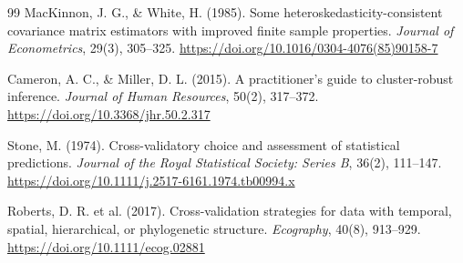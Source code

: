 \documentclass{style}
\begin{document}
\begin{thebibliography}{99}
MacKinnon, J. G., \& White, H. (1985). Some heteroskedasticity-consistent covariance matrix estimators with improved finite sample properties. \textit{Journal of Econometrics}, 29(3), 305--325. \url{https://doi.org/10.1016/0304-4076(85)90158-7}

Cameron, A. C., \& Miller, D. L. (2015). A practitioner's guide to cluster-robust inference. \textit{Journal of Human Resources}, 50(2), 317--372. \url{https://doi.org/10.3368/jhr.50.2.317}

Stone, M. (1974). Cross-validatory choice and assessment of statistical predictions. \textit{Journal of the Royal Statistical Society: Series B}, 36(2), 111--147. \url{https://doi.org/10.1111/j.2517-6161.1974.tb00994.x}

Roberts, D. R. et al. (2017). Cross-validation strategies for data with temporal, spatial, hierarchical, or phylogenetic structure. \textit{Ecography}, 40(8), 913--929. \url{https://doi.org/10.1111/ecog.02881}

\end{thebibliography}
\end{document}

